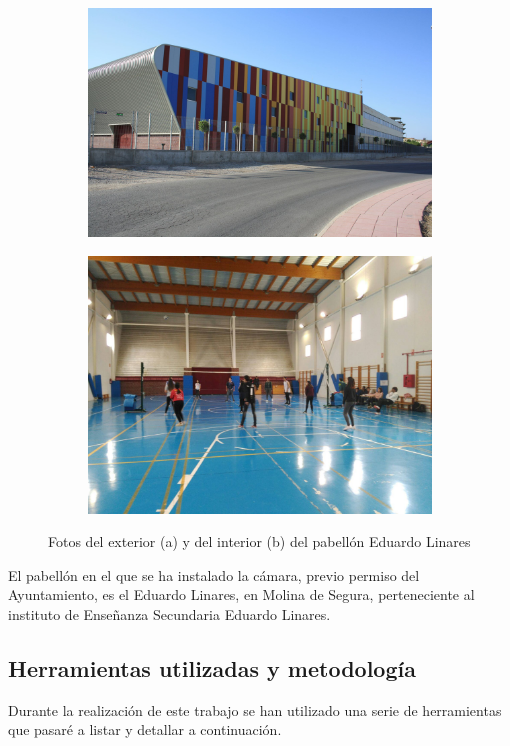 \begin{figure}
\begin{subfigure}{.5\textwidth}
  \centering
  \includegraphics[width=.9\linewidth]{images/EduardoLinares}
  \caption { }
  \label{fig:pabellonFuera}
\end{subfigure}%
\begin{subfigure}{.5\textwidth}
  \centering
  \includegraphics[width=.9\linewidth]{images/EduardoLinaresDentro}
  \caption { }
  \label{fig:pabellonDentro}
\end{subfigure}
\caption{Fotos del exterior (a) y del interior (b) del pabellón Eduardo Linares }
\label{fig:pabellon}
\end{figure}

El pabellón en el que se ha instalado la cámara, previo permiso del Ayuntamiento, es el Eduardo Linares, en Molina de Segura, perteneciente al instituto de Enseñanza Secundaria Eduardo Linares.

\subsection{Herramientas utilizadas y metodología}
Durante la realización de este trabajo se han utilizado una serie de herramientas que pasaré a listar y detallar a continuación.


